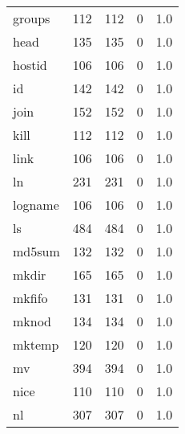 \begin{longtable}{lrrrr}
groups    &                     112 &              112 &                 0 &                          1.0 \\
head      &                     135 &              135 &                 0 &                          1.0 \\
hostid    &                     106 &              106 &                 0 &                          1.0 \\
id        &                     142 &              142 &                 0 &                          1.0 \\
join      &                     152 &              152 &                 0 &                          1.0 \\
kill      &                     112 &              112 &                 0 &                          1.0 \\
link      &                     106 &              106 &                 0 &                          1.0 \\
ln        &                     231 &              231 &                 0 &                          1.0 \\
logname   &                     106 &              106 &                 0 &                          1.0 \\
ls        &                     484 &              484 &                 0 &                          1.0 \\
md5sum    &                     132 &              132 &                 0 &                          1.0 \\
mkdir     &                     165 &              165 &                 0 &                          1.0 \\
mkfifo    &                     131 &              131 &                 0 &                          1.0 \\
mknod     &                     134 &              134 &                 0 &                          1.0 \\
mktemp    &                     120 &              120 &                 0 &                          1.0 \\
mv        &                     394 &              394 &                 0 &                          1.0 \\
nice      &                     110 &              110 &                 0 &                          1.0 \\
nl        &                     307 &              307 &                 0 &                          1.0 \\

\end{longtable}
